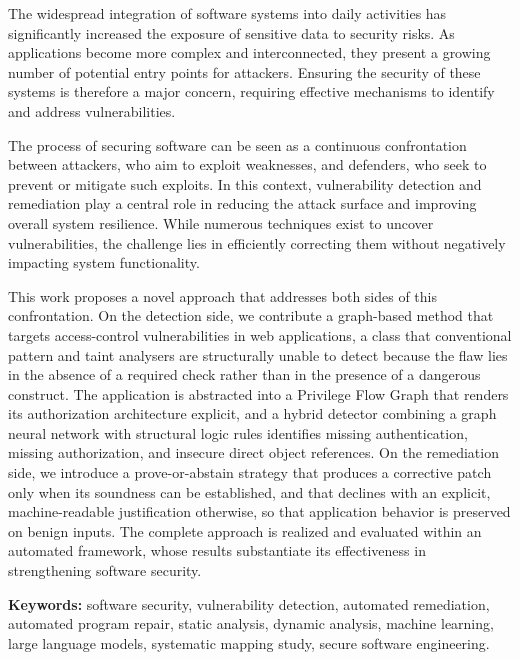 \documentclass[11pt,a4paper]{report}
\begin{document}
The widespread integration of software systems into daily activities has significantly
increased the exposure of sensitive data to security risks. As applications become more
complex and interconnected, they present a growing number of potential entry points for
attackers. Ensuring the security of these systems is therefore a major concern, requiring
effective mechanisms to identify and address vulnerabilities.

The process of securing software can be seen as a continuous confrontation between
attackers, who aim to exploit weaknesses, and defenders, who seek to prevent or mitigate
such exploits. In this context, vulnerability detection and remediation play a central role
in reducing the attack surface and improving overall system resilience. While numerous
techniques exist to uncover vulnerabilities, the challenge lies in efficiently correcting
them without negatively impacting system functionality.

This work proposes a novel approach that addresses both sides of this confrontation. On
the detection side, we contribute a graph-based method that targets access-control
vulnerabilities in web applications, a class that conventional pattern and taint analysers
are structurally unable to detect because the flaw lies in the absence of a required check
rather than in the presence of a dangerous construct. The application is abstracted into a
Privilege Flow Graph that renders its authorization architecture explicit, and a hybrid
detector combining a graph neural network with structural logic rules identifies missing
authentication, missing authorization, and insecure direct object references. On the
remediation side, we introduce a prove-or-abstain strategy that produces
a corrective patch only when its soundness can be established, and that declines with an
explicit, machine-readable justification otherwise, so that application behavior is
preserved on benign inputs. The complete approach is realized and evaluated within an
automated framework, whose results substantiate its effectiveness in strengthening
software security.

\medskip
\noindent\textbf{Keywords:} software security, vulnerability detection, automated
remediation, automated program repair, static analysis, dynamic analysis, machine learning,
large language models, systematic mapping study, secure software engineering.

\end{document}
